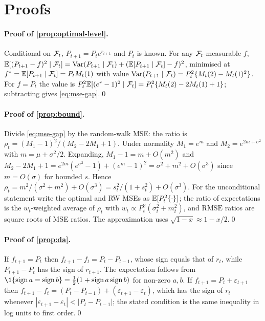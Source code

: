 \section{Proofs}\label{app:proofs}

\paragraph{Proof of \cref{prop:optimal-level}.}
Conditional on $\mathcal{F}_t$, $P_{t+1}=P_te^{r_{t+1}}$ and $P_t$ is known. For any $\mathcal{F}_t$-measurable $f$,
$\mathbb{E}[(P_{t+1}-f)^2\mid\mathcal{F}_t]=\operatorname{Var}(P_{t+1}\mid\mathcal{F}_t)+(\mathbb{E}[P_{t+1}\mid\mathcal{F}_t]-f)^2$, minimised at
$f^\ast=\mathbb{E}[P_{t+1}\mid\mathcal{F}_t]=P_tM_t(1)$ with value
$\operatorname{Var}(P_{t+1}\mid\mathcal{F}_t)=P_t^2\{M_t(2)-M_t(1)^2\}$. For $f=P_t$ the value is
$P_t^2\mathbb{E}[(e^{r}-1)^2\mid\mathcal{F}_t]=P_t^2\{M_t(2)-2M_t(1)+1\}$; subtracting gives \eqref{eq:mse-gap}.\qed

\paragraph{Proof of \cref{prop:bound}.}
Divide \eqref{eq:mse-gap} by the random-walk MSE: the ratio is
$\rho_t=(M_1-1)^2/(M_2-2M_1+1)$. Under normality $M_1=e^{m}$ and $M_2=e^{2m+\sigma^2}$ with
$m=\mu+\sigma^2/2$. Expanding, $M_1-1=m+O(m^2)$ and
$M_2-2M_1+1=e^{2m}(e^{\sigma^2}-1)+(e^{m}-1)^2=\sigma^2+m^2+O(\sigma^3)$ since $m=O(\sigma)$ for
bounded $s$. Hence $\rho_t=m^2/(\sigma^2+m^2)+O(\sigma^3)=s_t^2/(1+s_t^2)+O(\sigma^3)$. For the
unconditional statement write the optimal and RW MSEs as $\mathbb{E}[P_t^2\{\cdot\}]$; the ratio of
expectations is the $w_t$-weighted average of $\rho_t$ with $w_t\propto P_t^2(\sigma_t^2+m_t^2)$,
and $\mathrm{RMSE}$ ratios are square roots of MSE ratios. The approximation uses
$\sqrt{1-x}\approx1-x/2$.\qed

\paragraph{Proof of \cref{prop:da}.}
If $f_{t+1}=P_t$ then $f_{t+1}-f_t=P_t-P_{t-1}$, whose sign equals that of $r_t$, while
$P_{t+1}-P_t$ has the sign of $r_{t+1}$. The expectation follows from
$\1\{\operatorname{sign}a=\operatorname{sign}b\}=\tfrac12(1+\operatorname{sign}a\operatorname{sign}b)$ for non-zero $a,b$. If
$f_{t+1}=P_t+\varepsilon_{t+1}$ then $f_{t+1}-f_t=(P_t-P_{t-1})+(\varepsilon_{t+1}-\varepsilon_t)$,
which has the sign of $r_t$ whenever $|\varepsilon_{t+1}-\varepsilon_t|<|P_t-P_{t-1}|$; the stated
condition is the same inequality in log units to first order.\qed

